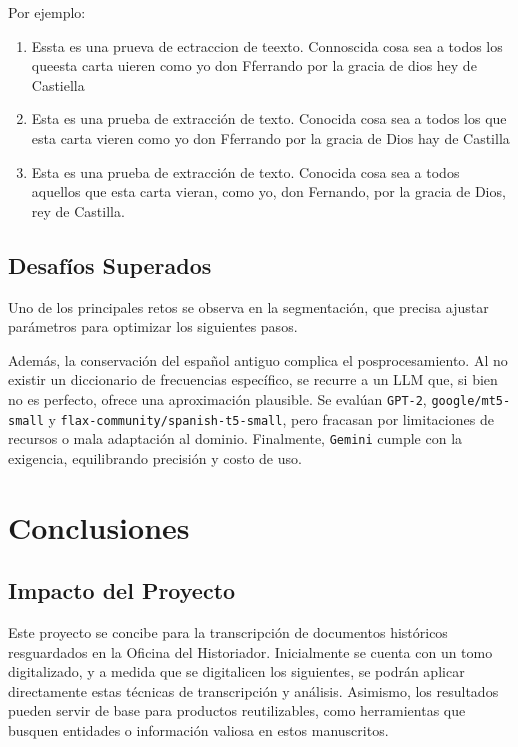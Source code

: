 \documentclass[11pt,a4paper]{article}
\begin{document}
Por ejemplo:

\begin{enumerate}
    \item Essta es una prueva de ectraccion de teexto. Connoscida cosa sea a todos los queesta carta uieren como yo don Fferrando por la gracia de dios hey de Castiella
    \item Esta es una prueba de extracción de texto. Conocida cosa sea a todos los que esta carta vieren como yo don Fferrando por la gracia de Dios hay de Castilla
    \item Esta es una prueba de extracción de texto. Conocida cosa sea a todos aquellos que esta carta vieran, como yo, don Fernando, por la gracia de Dios, rey de Castilla.
\end{enumerate}

\subsection{Desafíos Superados}

Uno de los principales retos se observa en la segmentación, que precisa ajustar parámetros para optimizar los siguientes pasos. 

Además, la conservación del español antiguo complica el posprocesamiento. Al no existir un diccionario de frecuencias específico, se recurre a un LLM que, si bien no es perfecto, ofrece una aproximación plausible. Se evalúan \texttt{GPT-2}, \texttt{google/mt5-small} y \texttt{flax-community/spanish-t5-small}, pero fracasan por limitaciones de recursos o mala adaptación al dominio. Finalmente, \texttt{Gemini} cumple con la exigencia, equilibrando precisión y costo de uso.

\section{Conclusiones}
\subsection{Impacto del Proyecto}

Este proyecto se concibe para la transcripción de documentos históricos resguardados en la Oficina del Historiador. Inicialmente se cuenta con un tomo digitalizado, y a medida que se digitalicen los siguientes, se podrán aplicar directamente estas técnicas de transcripción y análisis. Asimismo, los resultados pueden servir de base para productos reutilizables, como herramientas que busquen entidades o información valiosa en estos manuscritos.
\end{document}
